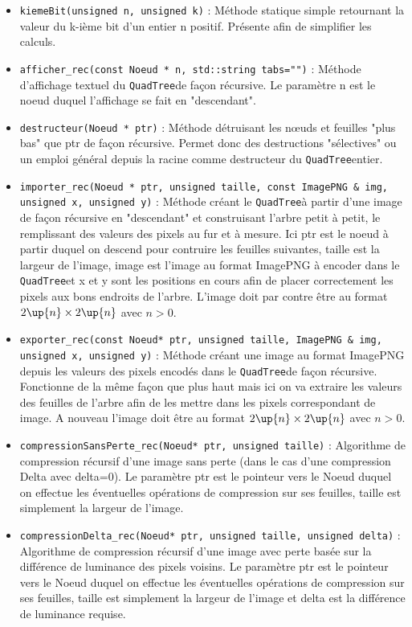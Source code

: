 \documentclass{article}
\newcommand{\info}{\texttt}
\newcommand{\qt}{\info{QuadTree}}
\begin{document}
	    \begin{itemize}
	    	\item \info{kiemeBit(unsigned n, unsigned k)} : Méthode statique simple retournant la valeur du k-ième bit d'un entier n positif. Présente afin de simplifier les calculs.
	    	\item \info{afficher_rec(const Noeud * n, std::string tabs="")} : Méthode d'affichage textuel du \qt de façon récursive. Le paramètre n est le noeud duquel l'affichage se fait en "descendant".
	    	\item \info{destructeur(Noeud * ptr)} : Méthode détruisant les nœuds et feuilles "plus bas" que ptr de façon récursive. Permet donc des destructions "sélectives" ou un emploi général depuis la racine comme destructeur du \qt entier.
	    	\item \info{importer_rec(Noeud * ptr, unsigned taille, const ImagePNG \& img, unsigned x, unsigned y)} : Méthode créant le \qt à partir d'une image de façon récursive en "descendant" et construisant l'arbre petit à petit, le remplissant des valeurs des pixels au fur et à mesure. Ici ptr est le noeud à partir duquel on descend pour contruire les feuilles suivantes, taille est la largeur de l'image, image est l'image au format ImagePNG à encoder dans le \qt et x et y sont les positions en cours afin de placer correctement les pixels aux bons endroits de l'arbre. L'image doit par contre être au format $2\up{n}\times2\up{n}$ avec $n>0$.
	    	\item \info{exporter_rec(const Noeud* ptr, unsigned taille, ImagePNG \& img, unsigned x, unsigned y)} : Méthode créant une image au format ImagePNG depuis les valeurs des pixels encodés dans le \qt de façon récursive. Fonctionne de la même façon que plus haut mais ici on va extraire les valeurs des feuilles de l'arbre afin de les mettre dans les pixels correspondant de image. A nouveau l'image doit être au format $2\up{n}\times2\up{n}$ avec $n>0$.
	    	\item \info{compressionSansPerte_rec(Noeud* ptr, unsigned taille)} : Algorithme de compression récursif d'une image sans perte (dans le cas d'une compression Delta avec delta=0). Le paramètre ptr est le pointeur vers le Noeud duquel on effectue les éventuelles opérations de compression sur ses feuilles, taille est simplement la largeur de l'image.
	    	\item \info{compressionDelta_rec(Noeud* ptr, unsigned taille, unsigned delta)} : Algorithme de compression récursif d'une image avec perte basée sur la différence de luminance des pixels voisins. Le paramètre ptr est le pointeur vers le Noeud duquel on effectue les éventuelles opérations de compression sur ses feuilles, taille est simplement la largeur de l'image et delta est la différence de luminance requise.

\end{itemize}
\end{document}
